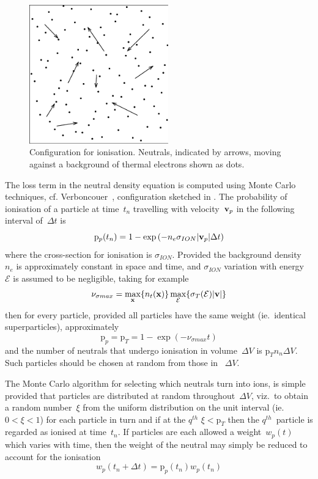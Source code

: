 \begin{figure}
\centerline{\includegraphics[width=6cm]{../png/harrows.png}}
\caption{Configuration for ionisation.
Neutrals, indicated by arrows, moving against a background of thermal electrons shown
as dots.  \label{fig:harrows}}
\end{figure}
The loss term in the neutral density equation is computed using Monte Carlo
techniques, cf. Verboncouer~\cite{Ve05Part}, configuration sketched in . The probability of ionisation of a
particle at time~$t_n$ travelling with velocity~${\bf v}_p$ in the following
interval of~$\Delta t$ is
\begin{equation}
\mathrm{p}_p(t_n) = 1-\exp\left(-n_e \sigma_{ION} |{\bf v}_p| \Delta t\right)
\end{equation}
where the cross-section for ionisation is $\sigma_{ION}$. Provided the background
density~$n_e$ is approximately constant in space and time, and $\sigma_{ION}$
variation with energy~$\mathcal{E}$ is assumed to be  negligible, taking 
for example
\begin{equation}
\nu_{\sigma max}= \max_{\bf x} \{n_t({\bf x})\}\max_{\mathcal{E}}\{\sigma_T(\mathcal{E}) |{\bf v}|\}
\end{equation}
then for every particle, provided all particles have the same weight (ie.\ identical
superparticles), approximately
\begin{equation}
\mathrm{p}_p =\mathrm{p}_T= 1-\exp\left(-\nu_{\sigma max} t\right)
\end{equation}
and the number of neutrals that undergo ionisation in volume~$\Delta V$
is $\mathrm{p}_T n_n \Delta V$. Such particles should be chosen at random from those
in ~$\Delta V$.

The Monte Carlo algorithm for selecting which neutrals turn into ions, is simple
provided that particles are distributed at random throughout~$\Delta V$, viz.\ to
obtain a random number~$\xi$ from the uniform distribution on the unit interval
(ie.\ $0<\xi<1$) for each particle in turn and if at the $q^{th}$
$\xi<\mathrm{p}_T$ then  the $q^{th}$~particle  is regarded as ionised at time~$t_n$.
If particles are each allowed a weight~$w_p(t)$  which varies with time, then the 
weight of the neutral may simply be reduced to account for the ionisation
\begin{equation}
w_p(t_n+\Delta t)=\mathrm{p}_p(t_n) w_p(t_n)
\end{equation}


